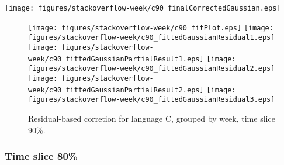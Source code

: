 \begin{center}
{\texttt{[image: figures/stackoverflow-week/c90\_finalCorrectedGaussian.eps]}}
\end{center}

\FloatBarrier

\begin{figure}[t]
\centering
{}
{\texttt{[image: figures/stackoverflow-week/c90\_fitPlot.eps]}}
{\texttt{[image: figures/stackoverflow-week/c90\_fittedGaussianResidual1.eps]}}
{\texttt{[image: figures/stackoverflow-week/c90\_fittedGaussianPartialResult1.eps]}}
{\texttt{[image: figures/stackoverflow-week/c90\_fittedGaussianResidual2.eps]}}
{\texttt{[image: figures/stackoverflow-week/c90\_fittedGaussianPartialResult2.eps]}}
{\texttt{[image: figures/stackoverflow-week/c90\_fittedGaussianResidual3.eps]}}
\caption{Residual-based corretion for language C, grouped by week, time slice 90\%.}
\end{figure}


\FloatBarrier


\subsubsection{Time slice 80\%}

